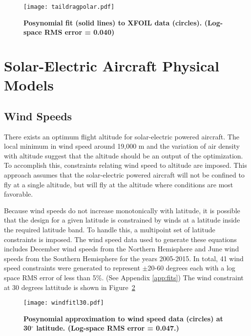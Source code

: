\begin{figure}[H]
	\begin{center}
	\texttt{[image: taildragpolar.pdf]}
    \caption{\textbf{Posynomial fit (solid lines) to XFOIL data (circles). (Log-space RMS error = 0.040)}}
	\label{f:taildragpolar}
	\end{center}
\end{figure}


\section{Solar-Electric Aircraft Physical Models}

\subsection{Wind Speeds}

There exists an optimum flight altitude for solar-electric powered aircraft.  
The local minimum in wind speed around 19,000 m and the variation of air density with altitude suggest that the altitude should be an output of the optimization. 
To accomplish this, constraints relating wind speed to altitude are imposed. 
This approach assumes that the solar-electric powered aircraft will not be confined to fly at a single altitude, but will fly at the altitude where conditions are most favorable.

Because wind speeds do not increase monotonically with latitude, it is possible that the design for a given latitude is constrained by winds at a latitude inside the required latitude band. 
To handle this, a multipoint set of latitude constraints is imposed. 
The wind speed data used to generate these equations includes December wind speeds from the Northern Hemisphere and June wind speeds from the Southern Hemisphere for the years 2005-2015.
In total, 41 wind speed constraints were generated to represent $\pm$20-60 degrees each with a log space RMS error of less than 5\%. (See Appendix \ref{app:fits}) The wind constraint at 30 degrees lattitude is shown in Figure~\ref{f:windfitl30}

\begin{figure}[H]
	\begin{center}
	\texttt{[image: windfitl30.pdf]}
    \caption{\textbf{Posynomial approximation to wind speed data\cite{wind} (circles) at 30$^{\circ}$ latitude. (Log-space RMS error = 0.047.)}}
	\label{f:windfitl30}
	\end{center}
\end{figure}


